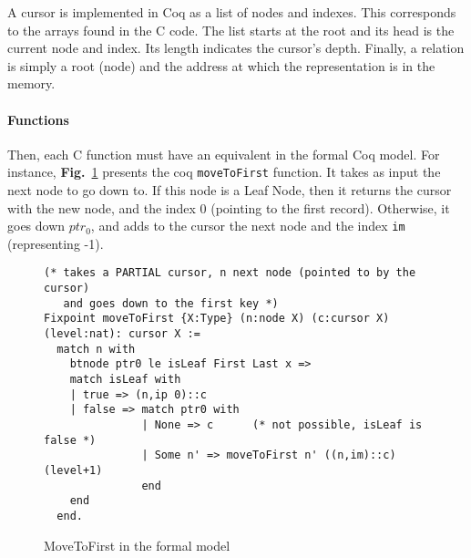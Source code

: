 A cursor is implemented in Coq as a list of nodes and indexes.
This corresponds to the arrays found in the C code. The list starts at the root and its head is the current node and index.
Its length indicates the cursor's depth.
Finally, a relation is simply a root (node) and the address at which the representation is in the memory.%

\paragraph{Functions} Then, each C function must have an equivalent in the formal Coq model.
For instance, \textbf{Fig.}~\ref{movetofirst} presents the coq \texttt{moveToFirst} function.
It takes as input the next node to go down to. If this node is a Leaf Node, then it returns the cursor with the new node, and the index 0 (pointing to the first record).
Otherwise, it goes down $ptr_0$, and adds to the cursor the next node and the index \texttt{im} (representing -1).

\begin{figure}
\begin{lstlisting}[language=Coq]
(* takes a PARTIAL cursor, n next node (pointed to by the cursor)
   and goes down to the first key *)
Fixpoint moveToFirst {X:Type} (n:node X) (c:cursor X) (level:nat): cursor X :=
  match n with
    btnode ptr0 le isLeaf First Last x =>
    match isLeaf with
    | true => (n,ip 0)::c
    | false => match ptr0 with
               | None => c      (* not possible, isLeaf is false *)
               | Some n' => moveToFirst n' ((n,im)::c) (level+1)
               end
    end
  end.
\end{lstlisting}
\caption{MoveToFirst in the formal model}
\label{movetofirst}
\end{figure}  
